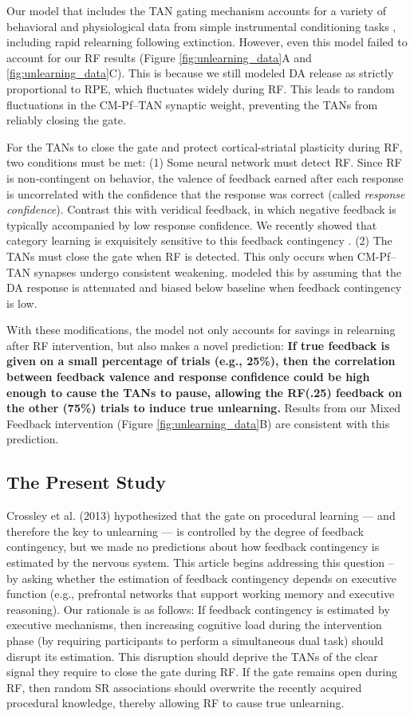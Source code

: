 \documentclass[apacite,draftfirst,jou]{apa6}
\begin{document}
Our model that includes the TAN gating mechanism accounts for a variety of
behavioral and physiological data from simple instrumental conditioning tasks
\cite{AshbyCrossley2011, CrossleyEtAl2016}, including rapid relearning following
extinction. However, even this model failed to account for our RF results
(Figure \ref{fig:unlearning_data}A and \ref{fig:unlearning_data}C). This is
because we still modeled DA release as strictly proportional to RPE, which
fluctuates widely during RF. This leads to random fluctuations in the CM-Pf--TAN
synaptic weight, preventing the TANs from reliably closing the gate.

For the TANs to close the gate and protect cortical-striatal plasticity during
RF, two conditions must be met: (1) Some neural network must detect RF. Since RF
is non-contingent on behavior, the valence of feedback earned after each
response is uncorrelated with the confidence that the response was correct
(called \textit{response confidence}). Contrast this with veridical feedback, in
which negative feedback is typically accompanied by low response confidence. We
recently showed that category learning is exquisitely sensitive to this feedback
contingency \cite{AshbyVucovich2016}. (2) The TANs must close the gate when RF
is detected. This only occurs when CM-Pf--TAN synapses undergo consistent
weakening.  modeled this by assuming that the DA
response is attenuated and biased below baseline when feedback contingency is
low.

With these modifications, the model not only accounts for savings in relearning
after RF intervention, but also makes a novel prediction: \textbf{If true
feedback is given on a small percentage of trials (e.g., 25\%), then the
correlation between feedback valence and response confidence could be high
enough to cause the TANs to pause, allowing the RF(.25) feedback on the other
(75\%) trials to induce true unlearning.} Results from our Mixed Feedback
intervention (Figure \ref{fig:unlearning_data}B) are consistent with this
prediction.

\subsection*{The Present Study}
Crossley et al. (2013) hypothesized that the gate on procedural learning --- and
therefore the key to unlearning --- is controlled by the degree of feedback
contingency, but we made no predictions about how feedback contingency is
estimated by the nervous system. This article begins addressing this question --
by asking whether the estimation of feedback contingency depends on executive
function (e.g., prefrontal networks that support working memory and executive
reasoning). Our rationale is as follows: If feedback contingency is estimated by
executive mechanisms, then increasing cognitive load during the intervention
phase (by requiring participants to perform a simultaneous dual task) should
disrupt its estimation. This disruption should deprive the TANs of the clear
signal they require to close the gate during RF. If the gate remains open during
RF, then random SR associations should overwrite the recently acquired
procedural knowledge, thereby allowing RF to cause true unlearning.
\end{document}
